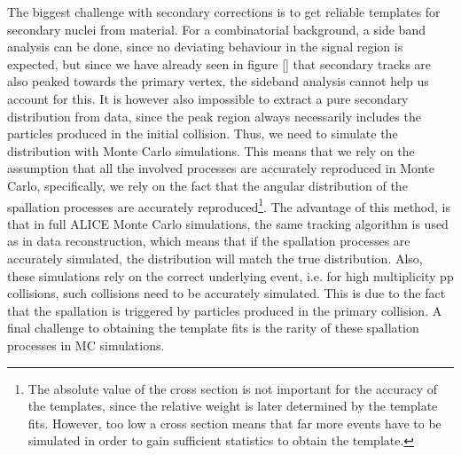 The biggest challenge with secondary corrections is to get reliable templates for secondary nuclei from material. For a combinatorial background, a side band analysis can be done, since no deviating behaviour in the signal region is expected, but since we have already seen in figure \ref{} that secondary tracks are also peaked towards the primary vertex, the sideband analysis cannot help us account for this. It is however also impossible to extract a pure secondary distribution from data, since the peak region always necessarily includes the particles produced in the initial collision. Thus, we need to simulate the distribution with Monte Carlo simulations. This means that we rely on the assumption that all the involved processes are accurately reproduced in Monte Carlo, specifically, we rely on the fact that the angular distribution of the spallation processes are accurately reproduced\footnote{The absolute value of the cross section is not important for the accuracy of the templates, since the relative weight is later determined by the template fits. However, too low a cross section means that far more events have to be simulated in order to gain sufficient statistics to obtain the template.}. The advantage of this method, is that in full ALICE Monte Carlo simulations, the same tracking algorithm is used as in data reconstruction, which means that if the spallation processes are accurately simulated, the distribution will match the true distribution. Also, these simulations rely on the correct underlying event, i.e. for high multiplicity pp collisions, such collisions need to be accurately simulated. This is due to the fact that the spallation is triggered by particles produced in the primary collision. A final challenge to obtaining the template fits is the rarity of these spallation processes in MC simulations. \\



